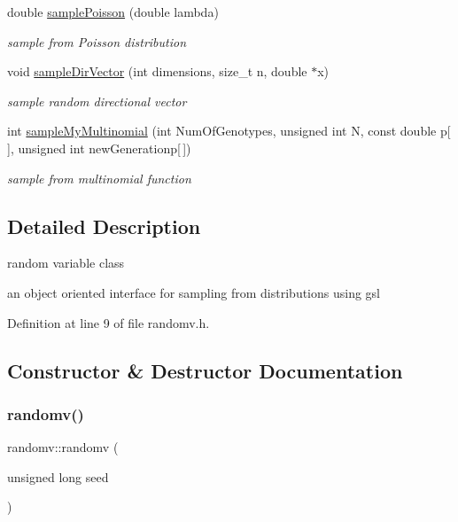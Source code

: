 \begin{DoxyCompactItemize}
\mbox{\label{classrandomv_a53890cf6d45e02337dbd348297f2901f}} 
double \hyperlink{classrandomv_a53890cf6d45e02337dbd348297f2901f}{sample\+Poisson} (double lambda)
\begin{DoxyCompactList}\small\item\em sample from Poisson distribution \end{DoxyCompactList}\item 
\mbox{\label{classrandomv_a8739e952003183c95986dd2873058735}} 
void \hyperlink{classrandomv_a8739e952003183c95986dd2873058735}{sample\+Dir\+Vector} (int dimensions, size\+\_\+t n, double $\ast$x)
\begin{DoxyCompactList}\small\item\em sample random directional vector \end{DoxyCompactList}\item 
\mbox{\label{classrandomv_ad9386cb5a1f8413515add301e707387f}} 
int \hyperlink{classrandomv_ad9386cb5a1f8413515add301e707387f}{sample\+My\+Multinomial} (int Num\+Of\+Genotypes, unsigned int N, const double p\mbox{[}$\,$\mbox{]}, unsigned int new\+Generationp\mbox{[}$\,$\mbox{]})
\begin{DoxyCompactList}\small\item\em sample from multinomial function \end{DoxyCompactList}\end{DoxyCompactItemize}


\subsection{Detailed Description}
random variable class 

an object oriented interface for sampling from distributions using gsl 

Definition at line 9 of file randomv.\+h.



\subsection{Constructor \& Destructor Documentation}
\mbox{\label{classrandomv_a82d37b6df4f44746c5858578c265cd96}} 
\subsubsection{\texorpdfstring{randomv()}{randomv()}}
{\footnotesize\ttfamily randomv\+::randomv (\begin{DoxyParamCaption}\item[{unsigned long}]{seed }\end{DoxyParamCaption})}



